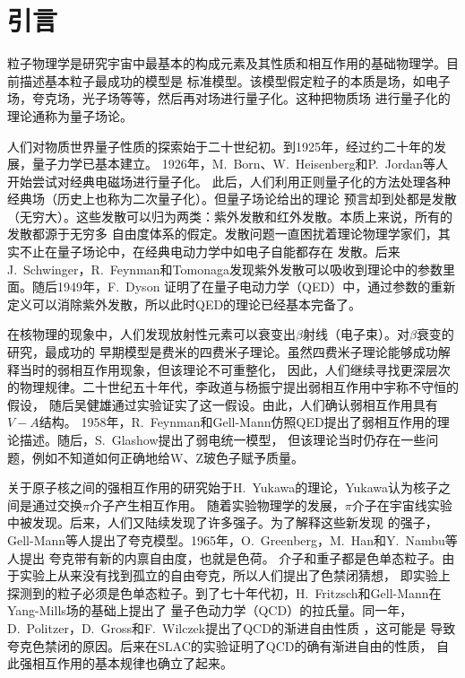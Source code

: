 
\chapter{引言}
粒子物理学是研究宇宙中最基本的构成元素及其性质和相互作用的基础物理学。目前描述基本粒子最成功的模型是
标准模型。该模型假定粒子的本质是场，如电子场，夸克场，光子场等等，然后再对场进行量子化。这种把物质场
进行量子化的理论通称为量子场论。

人们对物质世界量子性质的探索始于二十世纪初。到1925年，经过约二十年的发展，量子力学已基本建立。
1926年，M.~Born、W.~Heisenberg和P.~Jordan等人开始尝试对经典电磁场进行量子化。
此后，人们利用正则量子化的方法处理各种经典场（历史上也称为二次量子化）。但量子场论给出的理论
预言却到处都是发散（无穷大）。这些发散可以归为两类：紫外发散和红外发散。本质上来说，所有的发散都源于无穷多
自由度体系的假定。发散问题一直困扰着理论物理学家们，其实不止在量子场论中，在经典电动力学中如电子自能都存在
发散。后来J.~Schwinger，R.~Feynman和Tomonaga发现紫外发散可以吸收到理论中的参数里面。随后1949年，F.~Dyson
证明了在量子电动力学（QED）中，通过参数的重新定义可以消除紫外发散，所以此时QED的理论已经基本完备了。

在核物理的现象中，人们发现放射性元素可以衰变出$\beta$射线（电子束）。对$\beta$衰变的研究，最成功的
早期模型是费米的四费米子理论。虽然四费米子理论能够成功解释当时的弱相互作用现象，但该理论不可重整化，
因此，人们继续寻找更深层次的物理规律。二十世纪五十年代，李政道与杨振宁提出弱相互作用中宇称不守恒的假设，
随后吴健雄通过实验证实了这一假设。由此，人们确认弱相互作用具有$V-A$结构。
1958年，R.~Feynman和Gell-Mann仿照QED提出了弱相互作用的理论描述。随后，S.~Glashow提出了弱电统一模型，
但该理论当时仍存在一些问题，例如不知道如何正确地给W、Z玻色子赋予质量。

关于原子核之间的强相互作用的研究始于H.~Yukawa的理论，Yukawa认为核子之间是通过交换$\pi$介子产生相互作用。
随着实验物理学的发展，$\pi$介子在宇宙线实验中被发现。后来，人们又陆续发现了许多强子。为了解释这些新发现
的强子，Gell-Mann等人提出了夸克模型\cite{QuarkModel}。1965年，O.~Greenberg，M.~Han和Y.~Nambu等人提出
夸克带有新的内禀自由度，也就是色荷。
介子和重子都是色单态粒子。由于实验上从来没有找到孤立的自由夸克，所以人们提出了色禁闭猜想，
即实验上探测到的粒子必须是色单态粒子。到了七十年代初，H.~Fritzsch和Gell-Mann在Yang-Mills场的基础上提出了
量子色动力学（QCD）的拉氏量。同一年，D.~Politzer，D.~Gross和F.~Wilczek提出了QCD的渐进自由性质
\cite{Politzer,GrossWilczek}，这可能是
导致夸克色禁闭的原因。后来在SLAC的实验证明了QCD的确有渐进自由的性质，
自此强相互作用的基本规律也确立了起来。

